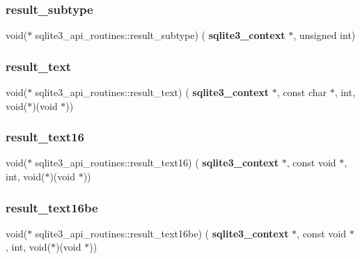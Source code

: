\subsubsection{result\_subtype}
{\footnotesize\ttfamily void($\ast$ sqlite3\+\_\+api\+\_\+routines\+::result\+\_\+subtype) (\textbf{ sqlite3\+\_\+context} $\ast$, unsigned int)}

\mbox{\label{structsqlite3__api__routines_abf4e25b69248ca865953d0d0768aa8c0}} 
\subsubsection{result\_text}
{\footnotesize\ttfamily void($\ast$ sqlite3\+\_\+api\+\_\+routines\+::result\+\_\+text) (\textbf{ sqlite3\+\_\+context} $\ast$, const char $\ast$, int, void($\ast$)(void $\ast$))}

\mbox{\label{structsqlite3__api__routines_ac7d4e41cae34faec587e871f91a0691d}} 
\subsubsection{result\_text16}
{\footnotesize\ttfamily void($\ast$ sqlite3\+\_\+api\+\_\+routines\+::result\+\_\+text16) (\textbf{ sqlite3\+\_\+context} $\ast$, const void $\ast$, int, void($\ast$)(void $\ast$))}

\mbox{\label{structsqlite3__api__routines_a953fc695bbec79fc5999bc9f2a0c94f3}} 
\subsubsection{result\_text16be}
{\footnotesize\ttfamily void($\ast$ sqlite3\+\_\+api\+\_\+routines\+::result\+\_\+text16be) (\textbf{ sqlite3\+\_\+context} $\ast$, const void $\ast$, int, void($\ast$)(void $\ast$))}

\mbox{\label{structsqlite3__api__routines_a6607ea8847a57d49bdf450205f4d580f}} 

